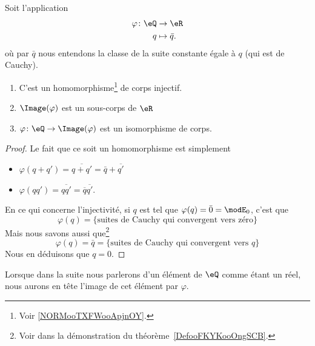 \begin{proposition}     \label{PropooEPFCooMtDOfP}
	Soit l'application
	\begin{equation}
		\begin{aligned}
			\varphi\colon \eQ & \to \eR          \\
			q                 & \mapsto \bar q .
		\end{aligned}
	\end{equation}
	où par \( \bar q\) nous entendons la classe de la suite constante égale à \( q\) (qui est de Cauchy).
	\begin{enumerate}
		\item
		      C'est un homomorphisme\footnote{Voir \ref{NORMooTXFWooApjnOY}.} de corps injectif.
		\item
		      \( \Image(\varphi)\) est un sous-corps de \( \eR\)
		\item
		      \( \varphi\colon \eQ\to \Image(\varphi)\) est un isomorphisme de corps.
	\end{enumerate}
\end{proposition}

\begin{proof}
	Le fait que ce soit un homomorphisme est simplement
	\begin{itemize}
		\item \( \varphi(q+q')=\overline{ q+q' }=\bar q+\overline{ q' }\)
		\item \( \varphi(qq')=\overline{ qq' }=\overline{ q }\overline{ q' }\).
	\end{itemize}
	En ce qui concerne l'injectivité, si \( q\) est tel que \( \varphi(q)=\bar 0=\modE_0\), c'est que
	\begin{equation}
		\varphi(q)=\{ \text{suites de Cauchy qui convergent vers zéro} \}
	\end{equation}
	Mais nous savons aussi que\footnote{Voir dans la démonstration du théorème~\ref{DefooFKYKooOngSCB}.}
	\begin{equation}
		\varphi(q)=\bar q=\{ \text{suites de Cauchy qui convergent vers } q \}
	\end{equation}
	Nous en déduisons que \( q=0\).
\end{proof}


\begin{normaltext}		\label{NORMooJIRRooDuqmru}
	Lorsque dans la suite nous parlerons d'un élément de \( \eQ\) comme étant un réel, nous aurons en tête l'image de cet élément par \( \varphi\).
\end{normaltext}

